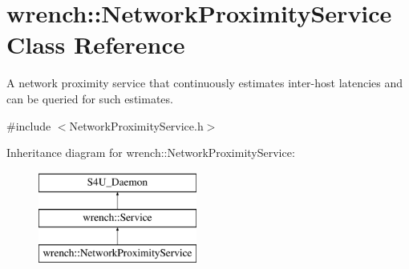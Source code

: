 \hypertarget{classwrench_1_1_network_proximity_service}{}\section{wrench\+:\+:Network\+Proximity\+Service Class Reference}
\label{classwrench_1_1_network_proximity_service}


A network proximity service that continuously estimates inter-\/host latencies and can be queried for such estimates.  




{\ttfamily \#include $<$Network\+Proximity\+Service.\+h$>$}

Inheritance diagram for wrench\+:\+:Network\+Proximity\+Service\+:\begin{figure}[H]
\begin{center}
\leavevmode
\includegraphics[height=3.000000cm]{classwrench_1_1_network_proximity_service}
\end{center}
\end{figure}
